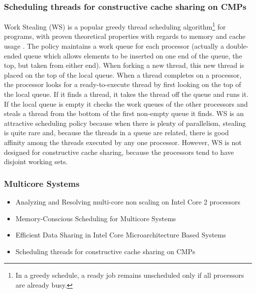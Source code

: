 \subsubsection{Scheduling threads for constructive cache sharing on
  CMPs \cite{Chen2007}}

Work Stealing (WS) is a popular greedy thread scheduling
algorithm\footnote{In a greedy schedule, a ready job remains
  unscheduled only if all processors are already busy.} for programs,
with proven theoretical properties with regards to memory and cache
usage \cite{Blumofe1998, Blumofe1999, Acar2000}. The policy maintains
a work queue for each processor (actually a double-ended queue which
allows elements to be inserted on one end of the queue, the top, but
taken from either end). When forking a new thread, this new thread is
placed on the top of the local queue. When a thread completes on a
processor, the processor looks for a ready-to-execute thread by first
looking on the top of the local queue. If it finds a thread, it takes
the thread off the queue and runs it. If the local queue is empty it
checks the work queues of the other processors and steals a thread
from the bottom of the first non-empty queue it finds. WS is an
attractive scheduling policy because when there is plenty of
parallelism, stealing is quite rare and, because the threads in a
queue are related, there is good affinity among the threads executed
by any one processor. However, WS is not designed for constructive
cache sharing, because the processors tend to have disjoint working
sets.

\subsubsection{Multicore Systems}

\begin{itemize}
\item[\textbullet] Analyzing and Resolving multi-core non scaling on
  Intel Core 2 processors \cite{Levinthal2007}
\item[\textbullet] Memory-Conscious Scheduling for Multicore Systems
  \cite{Majo2010}
\item[\textbullet] Efficient Data Sharing in Intel
  \textsuperscript{\textregistered} Core Microarchitecture Based
  Systems \cite{Shemer2007}
\item[\textbullet] Scheduling threads for constructive cache sharing
  on CMPs \cite{Chen2007}
\end{itemize}

